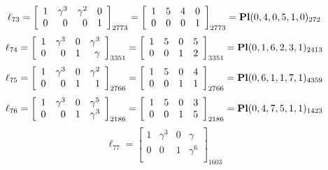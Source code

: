 \documentclass{article}
\begin{document}
{$$
\ell_{73} = 
\left[
\begin{array}{*{4}{r}}
1 & \gamma^{3} & \gamma^{2} & 0\\
0 & 0 & 0 & 1\\
\end{array}
\right]
_{2773}
=
\left[
\begin{array}{*{4}c}
1  & 5  & 4  & 0\\
0  & 0  & 0  & 1\\
\end{array}
\right]_{2773}
={\rm\bf Pl}(0,4,0,5,1,0 )_{272}$$
$$
\ell_{74} = 
\left[
\begin{array}{*{4}{r}}
1 & \gamma^{3} & 0 & \gamma^{3}\\
0 & 0 & 1 & \gamma \\
\end{array}
\right]
_{3351}
=
\left[
\begin{array}{*{4}c}
1  & 5  & 0  & 5\\
0  & 0  & 1  & 2\\
\end{array}
\right]_{3351}
={\rm\bf Pl}(0,1,6,2,3,1 )_{2413}$$
$$
\ell_{75} = 
\left[
\begin{array}{*{4}{r}}
1 & \gamma^{3} & 0 & \gamma^{2}\\
0 & 0 & 1 & 1\\
\end{array}
\right]
_{2766}
=
\left[
\begin{array}{*{4}c}
1  & 5  & 0  & 4\\
0  & 0  & 1  & 1\\
\end{array}
\right]_{2766}
={\rm\bf Pl}(0,6,1,1,7,1 )_{4359}$$
$$
\ell_{76} = 
\left[
\begin{array}{*{4}{r}}
1 & \gamma^{3} & 0 & \gamma^{5}\\
0 & 0 & 1 & \gamma^{3}\\
\end{array}
\right]
_{2186}
=
\left[
\begin{array}{*{4}c}
1  & 5  & 0  & 3\\
0  & 0  & 1  & 5\\
\end{array}
\right]_{2186}
={\rm\bf Pl}(0,4,7,5,1,1 )_{1423}$$
$$
\ell_{77} = 
\left[
\begin{array}{*{4}{r}}
1 & \gamma^{3} & 0 & \gamma \\
0 & 0 & 1 & \gamma^{6}\\
\end{array}
\right]
_{1603}
$$}
\end{document}
